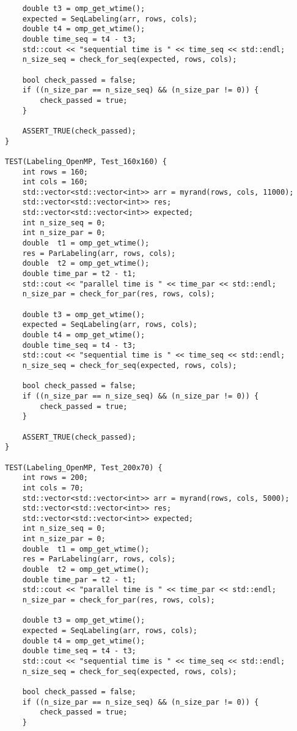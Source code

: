 \documentclass{report}
\begin{document}
\begin{lstlisting}
    double t3 = omp_get_wtime();
    expected = SeqLabeling(arr, rows, cols);
    double t4 = omp_get_wtime();
    double time_seq = t4 - t3;
    std::cout << "sequential time is " << time_seq << std::endl;
    n_size_seq = check_for_seq(expected, rows, cols);

    bool check_passed = false;
    if ((n_size_par == n_size_seq) && (n_size_par != 0)) {
        check_passed = true;
    }

    ASSERT_TRUE(check_passed);
}

TEST(Labeling_OpenMP, Test_160x160) {
    int rows = 160;
    int cols = 160;
    std::vector<std::vector<int>> arr = myrand(rows, cols, 11000);
    std::vector<std::vector<int>> res;
    std::vector<std::vector<int>> expected;
    int n_size_seq = 0;
    int n_size_par = 0;
    double  t1 = omp_get_wtime();
    res = ParLabeling(arr, rows, cols);
    double  t2 = omp_get_wtime();
    double time_par = t2 - t1;
    std::cout << "parallel time is " << time_par << std::endl;
    n_size_par = check_for_par(res, rows, cols);

    double t3 = omp_get_wtime();
    expected = SeqLabeling(arr, rows, cols);
    double t4 = omp_get_wtime();
    double time_seq = t4 - t3;
    std::cout << "sequential time is " << time_seq << std::endl;
    n_size_seq = check_for_seq(expected, rows, cols);

    bool check_passed = false;
    if ((n_size_par == n_size_seq) && (n_size_par != 0)) {
        check_passed = true;
    }

    ASSERT_TRUE(check_passed);
}

TEST(Labeling_OpenMP, Test_200x70) {
    int rows = 200;
    int cols = 70;
    std::vector<std::vector<int>> arr = myrand(rows, cols, 5000);
    std::vector<std::vector<int>> res;
    std::vector<std::vector<int>> expected;
    int n_size_seq = 0;
    int n_size_par = 0;
    double  t1 = omp_get_wtime();
    res = ParLabeling(arr, rows, cols);
    double  t2 = omp_get_wtime();
    double time_par = t2 - t1;
    std::cout << "parallel time is " << time_par << std::endl;
    n_size_par = check_for_par(res, rows, cols);

    double t3 = omp_get_wtime();
    expected = SeqLabeling(arr, rows, cols);
    double t4 = omp_get_wtime();
    double time_seq = t4 - t3;
    std::cout << "sequential time is " << time_seq << std::endl;
    n_size_seq = check_for_seq(expected, rows, cols);

    bool check_passed = false;
    if ((n_size_par == n_size_seq) && (n_size_par != 0)) {
        check_passed = true;
    }


\end{lstlisting}
\end{document}
